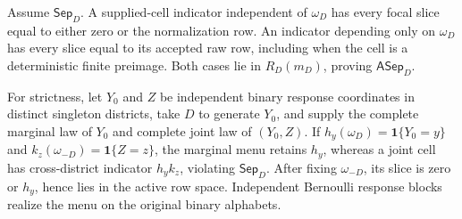 Assume \(\mathsf{Sep}_D\).  A supplied-cell indicator independent of \(\omega_D\) has every focal slice equal to either zero or the normalization row.  An indicator depending only on \(\omega_D\) has every slice equal to its accepted raw row, including when the cell is a deterministic finite preimage.  Both cases lie in \(R_D(m_D)\), proving \(\mathsf{ASep}_D\).

For strictness, let \(Y_0\) and \(Z\) be independent binary response coordinates in distinct singleton districts, take \(D\) to generate \(Y_0\), and supply the complete marginal law of \(Y_0\) and complete joint law of \((Y_0,Z)\).  If \(h_y(\omega_D)=\mathbf1\{Y_0=y\}\) and \(k_z(\omega_{-D})=\mathbf1\{Z=z\}\), the marginal menu retains \(h_y\), whereas a joint cell has cross-district indicator \(h_yk_z\), violating \(\mathsf{Sep}_D\).  After fixing \(\omega_{-D}\), its slice is zero or \(h_y\), hence lies in the active row space.  Independent Bernoulli response blocks realize the menu on the original binary alphabets.